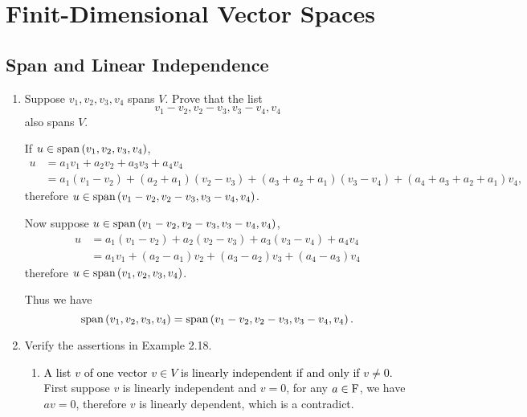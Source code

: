 \section{Finit-Dimensional Vector Spaces}

\subsection{Span and Linear Independence}

\begin{enumerate}
    \item Suppose $v_1, v_2, v_3, v_4$ spans $V$. Prove that the list 
        \[ v_1-v_2, v_2-v_3, v_3-v_4, v_4\]
        also spans $V$.
        \begin{solution}
            If $u \in \text{span}\left(v_1, v_2, v_3,v_4\right)$, \ie 
            \begin{align*}
                u &= a_1v_1 + a_2v_2 + a_3v_3 + a_4v_4 \\
                  &= a_1(v_1-v_2) + (a_2+a_1)(v_2-v_3)+(a_3+a_2+a_1)(v_3-v_4) + (a_4+a_3+a_2+a_1)v_4,
            \end{align*}
            therefore $u \in \text{span}\left( v_1-v_2, v_2-v_3, v_3-v_4, v_4\right)$.

            Now suppose $u \in \text{span}\left( v_1-v_2, v_2-v_3, v_3-v_4, v_4\right)$, \ie 
            \begin{align*}
                u &= a_1(v_1-v_2) + a_2(v_2-v_3) + a_3(v_3-v_4) + a_4v_4 \\
                  &= a_1v_1 + (a_2-a_1)v_2 + (a_3-a_2)v_3 + (a_4-a_3)v_4
            \end{align*}
            therefore $u \in \text{span}\left(v_1, v_2, v_3, v_4\right)$.

            Thus we have 
            \[ \text{span}\left(v_1, v_2, v_3, v_4\right) = \text{span}\left( v_1-v_2, v_2-v_3, v_3-v_4, v_4\right).\]
        \end{solution}
    \item Verify the assertions in Example 2.18.
        \begin{solution}
            \begin{enumerate}[label=(\alph*)]
                \item \textcolor{black}{A list $v$ of one vector $v \in V$ is linearly independent if and only if $v \neq 0$.}
                    First suppose $v$ is linearly independent and $v = 0$, for any $a \in \mathrm{F}$, we have $av=0$, therefore $v$ is linearly dependent, which is
                    a contradict.


\end{enumerate}
\end{solution}
\end{enumerate}

